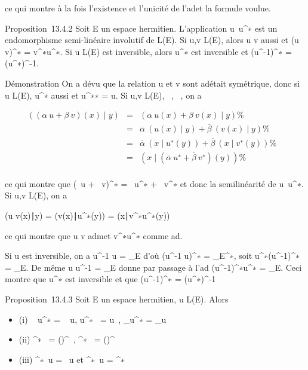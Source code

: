 \documentclass[]{article}
\begin{document}
ce qui montre à la fois l'existence et l'unicité de l'ad\jmathoint et la
formule voulue.

Proposition~13.4.2 Soit E un espace hermitien. L'application
u\mapsto~u^∗ est un endomorphisme
semi-linéaire involutif de L(E). Si u,v \in L(E), alors u \cdot v aussi et
(u \cdot v)^∗ = v^∗\cdot u^∗. Si u \in L(E) est
inversible, alors u^∗ est inversible et
(u^-1)^∗ = (u^∗)^-1.

Démonstration On a dé vu que la relation u et v sont ad\jmathoints était
symétrique, donc si u \in L(E), u^∗ aussi et u^∗∗ =
u. Si u,v \in L(E), \alpha~,\beta~ \in {}, on a

\begin{align*} ((\alpha~u +
\beta~v)(x)∣y)& =& (\alpha~u(x) +
\beta~v(x)∣y) \%&
\\ & =&
\overline\alpha~(u(x)∣y) +
\overline\beta~(v(x)∣y) \%&
\\ & =&
\overline\alpha~(x∣u^∗(y))
+
\overline\beta~(x∣v^∗(y))\%&
\\ & =&
(x∣(\overline\alpha~u^∗
+ \overline\beta~v^∗)(y)) \%&
\\ \end{align*}

ce qui montre que (\alpha~u + \beta~v)^∗ =
\overline\alpha~u^∗ +
\overline\beta~v^∗ et donc la semilinéarité de
u\mapsto~u^∗. Si u,v \in L(E), on a

(u \cdot v(x)∣y) =
(v(x)∣u^∗(y)) =
(x∣v^∗\cdot u^∗(y))

ce qui montre que u \cdot v admet v^∗\cdot u^∗ comme
ad\jmathoint.

Si u est inversible, on a u^-1 \cdot u =
\mathrmId\_E d'où (u^-1 \cdot
u)^∗ = \mathrmId\_E^∗, soit
u^∗\cdot (u^-1)^∗ =
\mathrmId\_E. De même u \cdot u^-1 =
\mathrmId\_E donne par passage à l'ad\jmathoint
(u^-1)^∗\cdot u^∗ =
\mathrmId\_E. Ceci montre que u^∗
est inversible et que (u^-1)^∗ =
(u^∗)^-1

Proposition~13.4.3 Soit E un espace hermitien, u \in L(E). Alors

\begin{itemize}
\itemsep1pt\parskip0pt
\item
  (i) ~
  u^∗ =
  \overline{}~
  u,
  u^∗~ =
  \overline{}u~,
  \chi\_u^∗ = \overline\chi\_u
\item
  (ii)
  \mathrmKeru^∗~
  =
  (\mathrmImu)^\bot~,
  \mathrmImu^∗~ =
  (\mathrmKeru)^\bot~
\item
  (iii)
  \mathrmKeru^∗~u
  = \mathrmKer~u et
  \mathrmImu^∗~u
  = \mathrmImu^∗~
\end{itemize}
\end{document}
